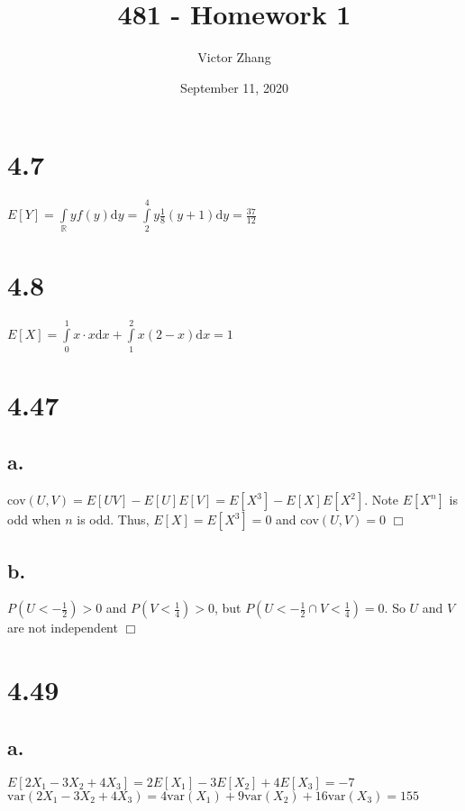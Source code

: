 \documentclass{article}
\title{481 - Homework 1}
\author{Victor Zhang}
\date{September 11, 2020}
\begin{document}
\maketitle

\section*{4.7}
$E[Y] = \int\limits_\mathbb{R} y f(y) \textrm{d}y = \int\limits_2^4 y\frac{1}{8}(y+1)\textrm{d}y = \frac{37}{12}$

\section*{4.8}
$E[X] = \int\limits_0^1 x \cdot x \textrm{d}x + \int\limits_1^2 x(2-x) \textrm{d}x = 1$

\section*{4.47}
\subsection*{a.}
$\textrm{cov}(U,V) = E[UV] - E[U]E[V] = E[X^3] - E[X]E[X^2]$. Note $E[X^n]$ is odd when $n$ is odd. Thus, $E[X] = E[X^3] = 0$ and $\textrm{cov}(U,V) = 0$ $\Box$

\subsection*{b.}
$P(U < -\frac{1}{2}) > 0$ and $P(V < \frac{1}{4}) > 0$, but $P(U < -\frac{1}{2} \cap V < \frac{1}{4}) = 0$. So $U$ and $V$ are not independent $\Box$

\section*{4.49}
\subsection*{a.}
$E[2X_1 - 3X_2 + 4X_3] = 2E[X_1] - 3E[X_2] + 4E[X_3] = -7$\\
$\mathrm{var}(2X_1 - 3X_2 + 4X_3) = 4 \mathrm{var}(X_1) + 9 \mathrm{var}(X_2) + 16 \mathrm{var}(X_3) = 155$
\end{document}
